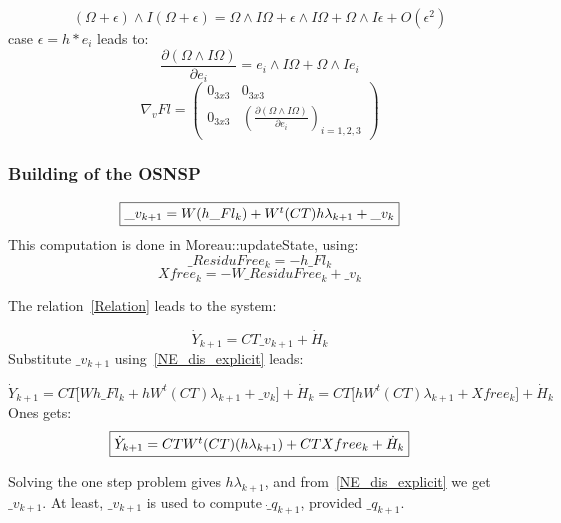 \[ (\Omega+\epsilon)  \wedge I(\Omega+\epsilon)=  \Omega  \wedge I\Omega + \epsilon \wedge I \Omega +  \Omega  \wedge I \epsilon + O(\epsilon ^2)\]
case $\epsilon = h*e_i$ leads to:
\begin{equation}
  \label{eq:NE_nablaFL1}
  \frac{\partial (\Omega \wedge I\Omega)}{\partial e_i}=e_i\wedge I\Omega+\Omega \wedge Ie_i
  \end{equation}
\[\nabla _v Fl = \left(\begin{array}{cc}
0_{3x3}&0_{3x3}\\
0_{3x3}&\left(\frac{\partial (\Omega \wedge I\Omega)}{\partial e_i}\right)_{i=1,2,3}
\end{array}\right)\]

\subsubsection{Building of the OSNSP}

\begin{equation}
  \label{NE_dis_explicit}
  \fbox{$
   \_v_{k+1}=
   W (h \_Fl_k)+
   W ^t(CT)h\lambda _{k+1}+ \_v_k
   $}
  \end{equation}
  This computation is done in Moreau::updateState, using:
  \[\_ResiduFree_k = -h \_Fl_k\]
  \[Xfree_k = -W \_ResiduFree_k + \_v_k\]

The relation~\ref{Relation} leads to the system:

\[\dot Y _{k+1}= C T \_v_{k+1} + \dot H _{k} \]
Substitute $  \_v_{k+1} $ using~\ref{NE_dis_explicit} leads:

\[\dot Y _{k+1}= C T \lbrack W h\_Fl_k+
   hW^t(CT) \lambda _{k+1}+ \_v_k \rbrack
   + \dot H _{k} = C T \lbrack  hW ^t(CT) \lambda _{k+1}+ Xfree_k \rbrack
   + \dot H _{k}\]
Ones gets:
\[\fbox{$
\dot Y _{k+1}= C T W ^t(CT) (h\lambda _{k+1}) + CT Xfree_k +\dot H _{k} $}\]


Solving the one step problem gives $h\lambda _{k+1}$, and from~\ref{NE_dis_explicit} we get
$ \_v_{k+1} $. At least, $ \_v_{k+1} $ is used to compute $\dot \_q_{k+1}$, provided $\_q_{k+1}$.

